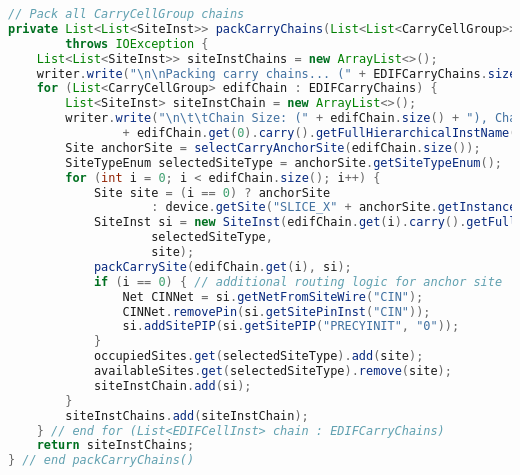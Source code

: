 \newpage
\begin{lstlisting}[language=java, caption={Packing \texttt{CarryCellGroup}s into \texttt{SLICEL} \texttt{SiteInst}s.}, label={lst:carry_cell_group_chains}]
// Pack all CarryCellGroup chains
private List<List<SiteInst>> packCarryChains(List<List<CarryCellGroup>> EDIFCarryChains)
        throws IOException {
    List<List<SiteInst>> siteInstChains = new ArrayList<>();
    writer.write("\n\nPacking carry chains... (" + EDIFCarryChains.size() + ")");
    for (List<CarryCellGroup> edifChain : EDIFCarryChains) {
        List<SiteInst> siteInstChain = new ArrayList<>();
        writer.write("\n\t\tChain Size: (" + edifChain.size() + "), Chain Anchor: "
                + edifChain.get(0).carry().getFullHierarchicalInstName());
        Site anchorSite = selectCarryAnchorSite(edifChain.size());
        SiteTypeEnum selectedSiteType = anchorSite.getSiteTypeEnum();
        for (int i = 0; i < edifChain.size(); i++) {
            Site site = (i == 0) ? anchorSite
                    : device.getSite("SLICE_X" + anchorSite.getInstanceX() + "Y" + (anchorSite.getInstanceY() + i));
            SiteInst si = new SiteInst(edifChain.get(i).carry().getFullHierarchicalInstName(), design,
                    selectedSiteType,
                    site);
            packCarrySite(edifChain.get(i), si);
            if (i == 0) { // additional routing logic for anchor site
                Net CINNet = si.getNetFromSiteWire("CIN");
                CINNet.removePin(si.getSitePinInst("CIN"));
                si.addSitePIP(si.getSitePIP("PRECYINIT", "0"));
            }
            occupiedSites.get(selectedSiteType).add(site);
            availableSites.get(selectedSiteType).remove(site);
            siteInstChain.add(si);
        }
        siteInstChains.add(siteInstChain);
    } // end for (List<EDIFCellInst> chain : EDIFCarryChains)
    return siteInstChains;
} // end packCarryChains()
\end{lstlisting}


